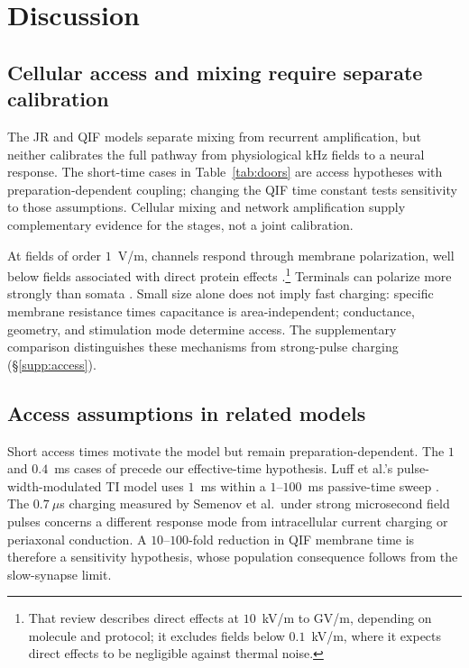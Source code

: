 \documentclass[11pt,a4paper]{article}
\newif\ifjne
\begin{document}
\section{Discussion}\label{sec:discussion}
\subsection{Cellular access and mixing require separate calibration}
The JR and QIF models separate mixing from recurrent amplification, but neither
calibrates the full pathway from physiological kHz fields to a neural response.
The short-time cases in Table~\ref{tab:doors} are access hypotheses with
preparation-dependent coupling; changing the QIF time constant tests sensitivity
to those assumptions. Cellular mixing \cite{mirzakhalili2020,luff2024mixer}
and network amplification \cite{caldas2024,karimi2024,esmaeilpour2021} supply
complementary evidence for the stages, not a joint calibration.

At fields of order $1$~V/m, channels respond through membrane polarization,
well below fields associated with direct protein effects
\cite{cifra2026}.\footnote{That review describes direct effects at $10$~kV/m
to GV/m, depending on molecule and protocol; it excludes fields below
$0.1$~kV/m, where it expects direct effects to be negligible against thermal noise.}
Terminals can polarize more strongly than somata
\cite{rahman2013,aberra2023,chakraborty2018}. Small size alone does not imply
fast charging: specific membrane resistance times capacitance is area-independent;
conductance, geometry, and stimulation mode determine access. The supplementary
comparison distinguishes these mechanisms from strong-pulse charging
(\S\ref{supp:access}).
\ifjne\else
\subsection{Access assumptions in related models}
Short access times motivate the model but remain preparation-dependent.
The $1$ and $0.4$~ms cases of \cite{esmaeilpour2021} precede our effective-time
hypothesis. Luff et al.'s pulse-width-modulated TI model uses $1$~ms within a
$1$--$100$~ms passive-time sweep \cite{luff2024}. The $0.7~\mu$s charging
measured by Semenov et al.\ under strong microsecond field pulses
\cite{semenov2025} concerns a different response mode from intracellular
current charging or periaxonal conduction. A $10$--$100$-fold reduction in
QIF membrane time is therefore a sensitivity hypothesis, whose population
consequence follows from the slow-synapse limit.
\end{document}
